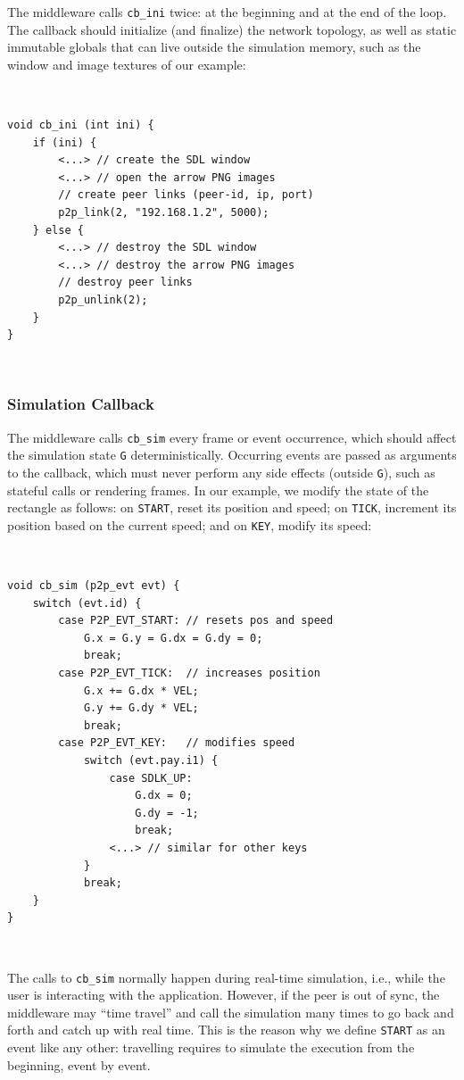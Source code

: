 \documentclass[10pt,journal,compsoc]{IEEEtran}
\newcommand{\code}[1]  {\texttt{\small{#1}}}
\begin{document}
The middleware calls \code{cb\_ini} twice: at the beginning and at the end of
the loop.
The callback should initialize (and finalize) the network topology, as well as
static immutable globals that can live outside the simulation memory, such as
the window and image textures of our example:

{\footnotesize
~
\begin{verbatim}
void cb_ini (int ini) {
    if (ini) {
        <...> // create the SDL window
        <...> // open the arrow PNG images
        // create peer links (peer-id, ip, port)
        p2p_link(2, "192.168.1.2", 5000);
    } else {
        <...> // destroy the SDL window
        <...> // destroy the arrow PNG images
        // destroy peer links
        p2p_unlink(2);
    }
}
\end{verbatim}
~
}

\subsubsection{Simulation Callback}
\label{sec.tml.api.cb_sim}

The middleware calls \code{cb\_sim} every frame or event occurrence, which
should affect the simulation state \code{G} deterministically.
Occurring events are passed as arguments to the callback, which must never
perform any side effects (outside \code{G}), such as stateful calls or
rendering frames.
In our example, we modify the state of the rectangle as follows:
    on \code{START}, reset its position and speed;
    on \code{TICK},  increment its position based on the current speed; and
    on \code{KEY},   modify its speed:

{\footnotesize
~
\begin{verbatim}
void cb_sim (p2p_evt evt) {
    switch (evt.id) {
        case P2P_EVT_START: // resets pos and speed
            G.x = G.y = G.dx = G.dy = 0;
            break;
        case P2P_EVT_TICK:  // increases position
            G.x += G.dx * VEL;
            G.y += G.dy * VEL;
            break;
        case P2P_EVT_KEY:   // modifies speed
            switch (evt.pay.i1) {
                case SDLK_UP:
                    G.dx = 0;
                    G.dy = -1;
                    break;
                <...> // similar for other keys
            }
            break;
    }
}
\end{verbatim}
~
}

The calls to \code{cb\_sim} normally happen during real-time simulation, i.e.,
while the user is interacting with the application.
However, if the peer is out of sync, the middleware may ``time travel'' and
call the simulation many times to go back and forth and catch up with real
time.
This is the reason why we define \code{START} as an event like any other:
travelling requires to simulate the execution from the beginning, event by
event.
\end{document}
